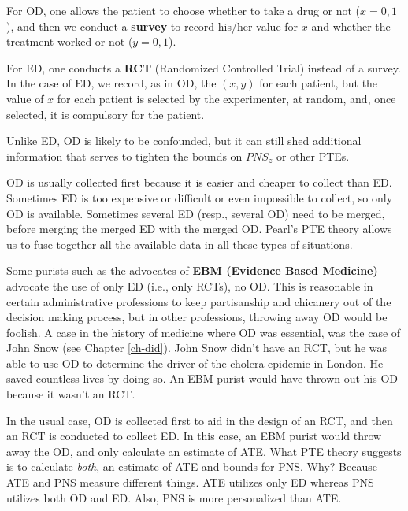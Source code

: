 For OD, one allows
the patient to
choose whether to take
a drug
or not ($x=0,1$),
and then we conduct a {\bf survey}
to record his/her
value for $x$
and whether the treatment
worked or not ($y=0,1$).

For ED, one conducts a {\bf RCT}
(Randomized Controlled Trial)
instead of a survey.
In the case of ED,
we record, as in OD, the $(x,y)$
for each patient, but
the value of $x$ for each
patient is selected by the
experimenter, at random,
and, once selected, it
 is compulsory for the
patient.

Unlike ED, OD is likely
to be confounded, but
it can still shed
additional information
that serves to tighten
the bounds on
$PNS_z$ or other PTEs.

OD is usually collected first
because it is easier and cheaper to collect
than ED. Sometimes ED is too expensive or difficult
or even impossible to collect,
so only OD is available.
Sometimes several ED (resp., several OD)
need to be merged, before merging
the merged ED with the merged OD. Pearl's PTE theory
allows us to fuse together all the
available data
in all these types of
situations.

Some purists such as the advocates of {\bf EBM (Evidence Based Medicine)}
advocate the use of only ED (i.e., only RCTs), no OD. This is reasonable in
certain administrative  professions to keep partisanship and chicanery out of
the decision making process, but in other professions, throwing away OD would
be foolish.  A case in the history of medicine where OD was
essential, was the case of John Snow (see Chapter \ref{ch-did}). John Snow
didn't have an RCT, but he was able to use OD to determine the driver of the
cholera epidemic in London. He saved countless lives by doing so. An EBM
purist would have thrown out his OD because it wasn't an RCT.

In the usual case, OD is collected first to aid in the design of an RCT, and
then an RCT is conducted to collect ED. In this case, an EBM purist would
throw away the OD, and only calculate an estimate of ATE.
What PTE theory
suggests is to calculate {\it both}, an estimate of ATE and bounds for PNS.
Why? Because ATE and PNS measure different things. ATE utilizes only ED
whereas PNS utilizes both OD and ED. Also, PNS is more personalized than ATE.


